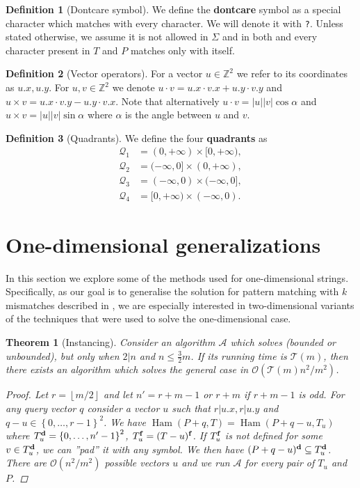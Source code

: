 \documentclass[11pt]{article}
\newcommand{\Z}{\mathbb{Z}}
\renewcommand{\O}{\mathcal{O}}
\renewcommand{\phi}{\varphi}
\newcommand{\set}[1]{\left\lbrace #1 \right\rbrace}
\newcommand{\floor}[1]{\left\lfloor #1 \right\rfloor}
\newcommand{\eq}[1]{\begin{align*} #1 \end{align*}}
\DeclareMathOperator*{\Ham}{Ham}
\theoremstyle{plain}
\newtheorem{theorem}{Theorem}
\theoremstyle{definition}
\newtheorem{definition}{Definition}
\theoremstyle{remark}
\begin{document}
\begin{definition}[Dontcare symbol]
	We define the \textbf{dontcare} symbol as a special character which matches with every character.
	We will denote it with \texttt{?}.
	Unless stated otherwise, we assume it is not allowed in $\Sigma$ and in both \hd and \HD every character present in $T$ and $P$ matches only with itself.
\end{definition}


\newcommand{\x}[1]{#1.x}
\newcommand{\y}[1]{#1.y}
\newcommand{\h}[1]{\phi \times #1}
\newcommand{\s}[1]{\psi \times #1}
\begin{definition}[Vector operators]
	For a vector $u \in \Z^2$ we refer to its coordinates as $\x{u}, \y{u}$.
	For $u, v \in \Z^2$ we denote $u \cdot v = \x{u} \cdot \x{v} + \y{u} \cdot \y{v}$
	and $u \times v = \x{u} \cdot \y{v} - \y{u} \cdot \x{v}$.
	Note that alternatively $u \cdot v = |u||v| \cos \alpha$ and $u \times v = |u||v| \sin \alpha$ where $\alpha$ is the angle between $u$ and $v$.
\end{definition}


\newcommand{\Q}{\mathcal{Q}}
\begin{definition}[Quadrants]
	We define the four \textbf{quadrants} as
	\eq{
		\Q_1 &= (0, +\infty) \times [0, +\infty), \\
		\Q_2 &= (-\infty, 0] \times (0, +\infty), \\
		\Q_3 &= (-\infty, 0) \times (-\infty, 0], \\
		\Q_4 &= [0, +\infty) \times (-\infty, 0).
	}
\end{definition}


\section{One-dimensional generalizations}
In this section we explore some of the methods used for one-dimensional strings.
Specifically, as our goal is to generalise the solution for pattern matching with $k$ mismatches described in \cite{Gawrychowski2017}, we are especially interested in two-dimensional variants of the techniques that were used to solve the one-dimensional case.


\begin{theorem}[Instancing]\label{instancing}
	Consider an algorithm $\mathcal{A}$ which solves \HD (bounded or unbounded), but only when $2|n$ and $n \le \frac{3}{2}m$.
	If its running time is $\mathcal{T}(m)$, then there exists an algorithm which solves the general case in $\O(\mathcal{T}(m) n^2 / m^2)$.
	\begin{proof}
		Let $r = \floor{m / 2}$ and let $n' = r + m - 1$ or $r + m$ if $r + m - 1$ is odd.
		For any query vector $q$ consider a vector $u$ such that $r|u.x, r|u.y$ and $q - u \in \set{0, \dots, r - 1}^2$.
		We have $\Ham(P + q, T) = \Ham(P + q - u, T_u)$ where $\d{T_u} = \set{0, \dots, n' - 1}^2$, $T_u^\mathbf{f} = (T - u)^\mathbf{f}$.
		If $T_u^\mathbf{f}$ is not defined for some $v \in T_u^\mathbf{d}$, we can ''pad'' it with any symbol.
		We then have $(P + q - u)^\mathbf{d} \subseteq T_u^\mathbf{d}$.
		There are $\O(n^2 / m^2)$ possible vectors $u$ and we run $\mathcal{A}$ for every pair of $T_u$ and $P$.
	\end{proof}
\end{theorem}
\end{document}
